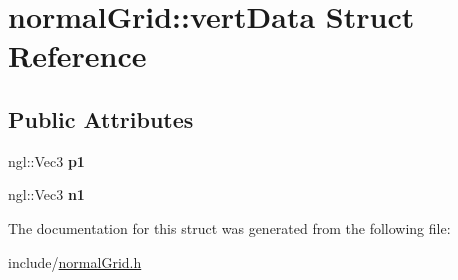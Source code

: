 \hypertarget{structnormalGrid_1_1vertData}{\section{normal\-Grid\-:\-:vert\-Data Struct Reference}
\label{structnormalGrid_1_1vertData}
}
\subsection*{Public Attributes}
\begin{DoxyCompactItemize}
\item 
\hypertarget{structnormalGrid_1_1vertData_ada31f752183842ff202f84a287a0ec16}{ngl\-::\-Vec3 {\bfseries p1}}\label{structnormalGrid_1_1vertData_ada31f752183842ff202f84a287a0ec16}

\item 
\hypertarget{structnormalGrid_1_1vertData_a401129da48aebc6c8bbc185b84c7bdb0}{ngl\-::\-Vec3 {\bfseries n1}}\label{structnormalGrid_1_1vertData_a401129da48aebc6c8bbc185b84c7bdb0}

\end{DoxyCompactItemize}


The documentation for this struct was generated from the following file\-:\begin{DoxyCompactItemize}
\item 
include/\hyperlink{normalGrid_8h}{normal\-Grid.\-h}\end{DoxyCompactItemize}

